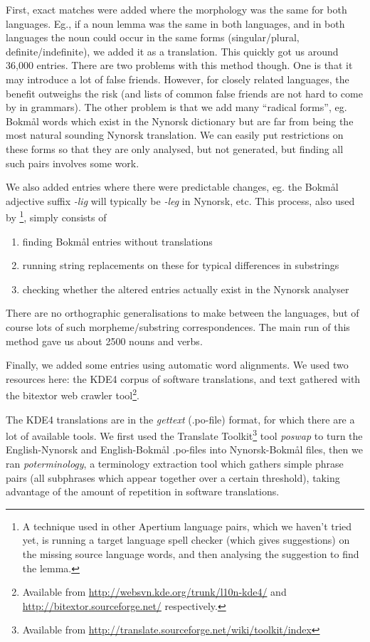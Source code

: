 \documentclass[11pt]{article}
\begin{document}
First, exact matches were added where the morphology was the same for
both languages. Eg., if a noun lemma was the same in both languages,
and in both languages the noun could occur in the same forms
(singular/plural, definite/indefinite), we added it as a
translation. This quickly got us around 36,000 entries. There are two
problems with this method though. One is that it may introduce a lot
of false friends. However, for closely related languages, the benefit
outweighs the risk (and lists of common false friends are not hard to
come by in grammars). The other problem is that we add many ``radical
forms'', eg. Bokmål words which exist in the Nynorsk dictionary but are
far from being the most natural sounding Nynorsk translation. We can
easily put restrictions on these forms so that they are only analysed,
but not generated, but finding all such pairs involves some work.

We also added entries where there were predictable changes, eg. the
Bokmål adjective suffix \emph{-lig} will typically be \emph{-leg} in Nynorsk,
etc. This process, also used by \citet[p.~4]{tyers2009dpm}\footnote{A technique used in other Apertium language pairs, which we
haven't tried yet, is running a target language spell checker (which
gives suggestions) on the missing source language words, and then
analysing the suggestion to find the lemma. },
simply consists of
\begin{enumerate}
\item finding Bokmål entries without translations
\item running string replacements on these for typical differences in
   substrings
\item checking whether the altered entries actually exist in the Nynorsk
   analyser
\end{enumerate}
There are no orthographic generalisations to make between the
languages, but of course lots of such morpheme/substring
correspondences. The main run of this method gave us about 2500 nouns
and verbs.

Finally, we added some entries using automatic word alignments. We
used two resources here: the KDE4 corpus of software translations, and
text gathered with the bitextor web crawler tool\footnote{Available from \href{http://websvn.kde.org/trunk/l10n-kde4/}{http://websvn.kde.org/trunk/l10n-kde4/} and
\href{http://bitextor.sourceforge.net/}{http://bitextor.sourceforge.net/} respectively. }. 

The KDE4 translations are in the \emph{gettext} (.po-file) format, for
which there are a lot of available tools. We first used the Translate
Toolkit\footnote{Available from
\href{http://translate.sourceforge.net/wiki/toolkit/index}{http://translate.sourceforge.net/wiki/toolkit/index} } tool \emph{poswap} to turn the English-Nynorsk and
English-Bokmål .po-files into Nynorsk-Bokmål files, then we ran
\emph{poterminology}, a terminology extraction tool which gathers simple
phrase pairs (all subphrases which appear together over a certain
threshold), taking advantage of the amount of repetition in software
translations. 
\end{document}
